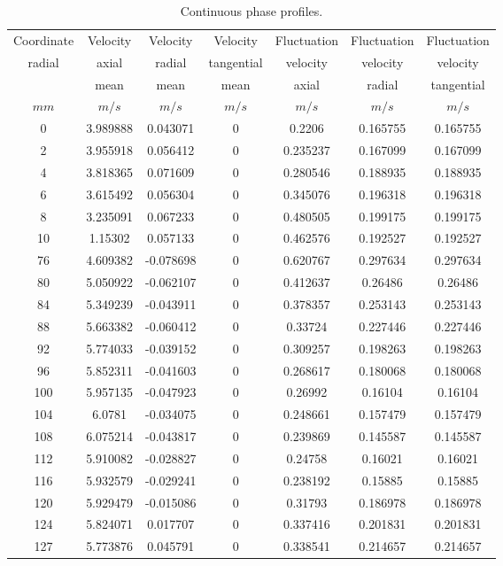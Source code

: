 \begin{itemize}
\begin{description}
\begin{table}[H]
\begin{center}
\begin{tabular}{|c|c|c|c|c|c|c|} \hline
Coordinate  & Velocity  & Velocity  & Velocity &
Fluctuation  & Fluctuation  & Fluctuation  \\
radial  & axial    &   radial  &  tangential   & velocity
& velocity    & velocity   \\
&mean & mean  & mean &  axial
&    radial &  tangential  \\
$mm$   & $m/s$  &  $m/s$ & $m/s$ & $m/s$& $m/s$& $m/s$ \\  \hline
0    & 3.989888 &  0.043071 & 0  & 0.2206   & 0.165755 & 0.165755 \\   \hline
2    & 3.955918 &  0.056412 & 0  & 0.235237 & 0.167099 & 0.167099 \\   \hline
4    & 3.818365 &  0.071609 & 0  & 0.280546 & 0.188935 & 0.188935 \\   \hline
6    & 3.615492 &  0.056304 & 0  & 0.345076 & 0.196318 & 0.196318 \\   \hline
8    & 3.235091 &  0.067233 & 0  & 0.480505 & 0.199175 & 0.199175 \\   \hline
10    & 1.15302  &  0.057133 & 0  & 0.462576 & 0.192527 & 0.192527 \\   \hline
76    & 4.609382 & -0.078698 & 0  & 0.620767 & 0.297634 & 0.297634 \\   \hline
80    & 5.050922 & -0.062107 & 0  & 0.412637 & 0.26486  & 0.26486  \\   \hline
84    & 5.349239 & -0.043911 & 0  & 0.378357 & 0.253143 & 0.253143 \\   \hline
88    & 5.663382 & -0.060412 & 0  & 0.33724  & 0.227446 & 0.227446 \\   \hline
92    & 5.774033 & -0.039152 & 0  & 0.309257 & 0.198263 & 0.198263 \\   \hline
96    & 5.852311 & -0.041603 & 0  & 0.268617 & 0.180068 & 0.180068 \\   \hline
100    & 5.957135 & -0.047923 & 0  & 0.26992  & 0.16104  & 0.16104  \\   \hline
104    & 6.0781   & -0.034075 & 0  & 0.248661 & 0.157479 & 0.157479 \\   \hline
108    & 6.075214 & -0.043817 & 0  & 0.239869 & 0.145587 & 0.145587 \\   \hline
112    & 5.910082 & -0.028827 & 0  & 0.24758  & 0.16021  & 0.16021  \\   \hline
116    & 5.932579 & -0.029241 & 0  & 0.238192 & 0.15885  & 0.15885  \\   \hline
120    & 5.929479 & -0.015086 & 0  & 0.31793  & 0.186978 & 0.186978 \\   \hline
124    & 5.824071 &  0.017707 & 0  & 0.337416 & 0.201831 & 0.201831 \\   \hline
127    & 5.773876 &  0.045791 & 0  & 0.338541 & 0.214657 & 0.214657 \\   \hline
\end {tabular}
\end{center}
\caption{Continuous phase profiles.}
\label{CL_fluide}
\end{table}


\end{description}
\end{itemize}

